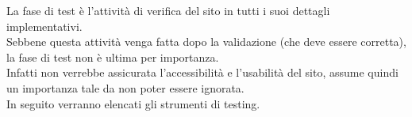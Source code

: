 La fase di test è l'attività di verifica del sito in tutti i suoi dettagli implementativi.\\ 
Sebbene questa attività venga fatta dopo la validazione (che deve essere corretta), la fase di test non è ultima per importanza.\\ 
Infatti non verrebbe assicurata l'accessibilità e l'usabilità del sito, assume quindi un importanza tale da non poter essere ignorata.\\
In seguito verranno elencati gli strumenti di testing.

